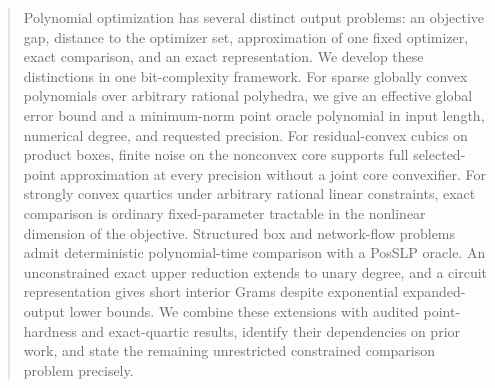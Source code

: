 \begin{abstract}
Polynomial optimization has several distinct output problems: an objective
gap, distance to the optimizer set, approximation of one fixed optimizer,
exact comparison, and an exact representation. We develop these distinctions
in one bit-complexity framework. For sparse globally convex polynomials over
arbitrary rational polyhedra, we give an effective global error bound and a
minimum-norm point oracle polynomial in input length, numerical degree, and
requested precision. For residual-convex cubics on product boxes, finite
noise on the nonconvex core supports full selected-point approximation at
every precision without a joint core convexifier. For strongly convex
quartics under arbitrary rational linear constraints, exact comparison is
ordinary fixed-parameter tractable in the nonlinear dimension of the
objective. Structured box and network-flow problems admit deterministic
polynomial-time comparison with a PosSLP oracle. An unconstrained exact upper
reduction extends to unary degree, and a circuit representation gives short
interior Grams despite exponential expanded-output lower bounds. We combine
these extensions with audited point-hardness and exact-quartic results,
identify their dependencies on prior work, and state the remaining
unrestricted constrained comparison problem precisely.
\end{abstract}
